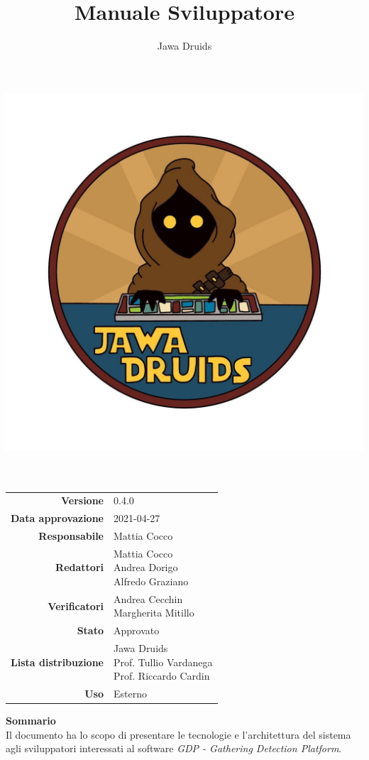 



\makeatletter
\begin{titlepage}
	\begin{center}
		\vspace*{-4cm}
		\author{Jawa Druids}
		\title{Manuale Sviluppatore}
		\date{} %
		\includegraphics[width=0.5\linewidth]{../immagini/DRUIDSLOGO.jpg}\\[4ex]
		{\huge \bfseries  \@title }\\[2ex]
		{\LARGE  \@author}\\[50ex]
		\vspace*{-9cm}
		\begin{table}[H]
			\renewcommand{\arraystretch}{1.4}
			\centering
			\begin{tabular}{r | l}
				\textbf{Versione} & 0.4.0 \\%
				\textbf{Data approvazione} & 2021-04-27 \\
				\textbf{Responsabile} & Mattia Cocco \\
				\textbf{Redattori} & \makecell[tl]{Mattia Cocco \\ Andrea Dorigo \\ Alfredo Graziano} \\
				\textbf{Verificatori} & \makecell[tl]{Andrea Cecchin \\ Margherita Mitillo} \\
				\textbf{Stato} & Approvato\\
				\textbf{Lista distribuzione} & \makecell[tl]{Jawa Druids \\ Prof. Tullio Vardanega \\ Prof. Riccardo Cardin}\\
				\textbf{Uso} & Esterno
			\end{tabular}
		\end{table}
		\vspace{0.1cm}
		\hfill \break
		\fontsize{17}{10}\textbf{Sommario} \\
		\vspace{0.1cm}
		Il documento ha lo scopo di presentare le tecnologie e l'architettura del sistema agli sviluppatori interessati al software \emph{\normalsize{\textit{GDP - Gathering Detection Platform}}}.
	\end{center}
\end{titlepage}
\makeatother
	


